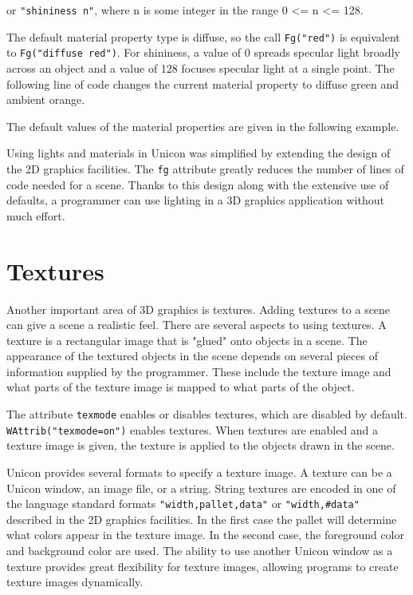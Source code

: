 
\noindent
or \texttt{"shininess n"}, where n is some integer
in the range 0 {\textless}= n {\textless}= 128.

The default material property type is diffuse, so the call
\texttt{Fg("red")} is equivalent to \texttt{Fg("diffuse red")}. For
shininess, a value of 0 spreads specular light broadly across an
object and a value of 128 focuses specular light at a single
point. The following line of code changes the current material
property to diffuse green and ambient orange.



\noindent The default values of the material properties are given in the
following example. 


Using lights and materials in Unicon was simplified by extending the
design of the 2D graphics facilities. The \texttt{fg} attribute
greatly reduces the number of lines of code needed for a scene. Thanks
to this design along with the extensive use of defaults, a programmer
can use lighting in a 3D graphics application without much effort.

\section{Textures}

Another important area of 3D graphics is textures.  Adding textures to
a scene can give a scene a realistic feel.  There are several aspects
to using textures. A texture is a rectangular image that is "glued"
onto objects in a scene. The appearance of the textured objects in the
scene depends on several pieces of information supplied by the
programmer. These include the texture image and what parts of the
texture image is mapped to what parts of the object.

The attribute \texttt{texmode} enables or disables textures, which are
disabled by default.  \texttt{WAttrib("texmode=on")} enables textures.
When textures are enabled and a texture image is given, the texture is
applied to the objects drawn in the scene.

Unicon provides several formats to specify a texture image. A texture
can be a Unicon window, an image file, or a string. String textures
are encoded in one of the language standard formats
\texttt{"width,pallet,data"} or \texttt{"width,\#data"} described in
the 2D graphics facilities. In the first case the pallet will
determine what colors appear in the texture image. In the second case,
the foreground color and background color are used. The ability to use
another Unicon window as a texture provides great flexibility for
texture images, allowing programs to create texture images
dynamically.

